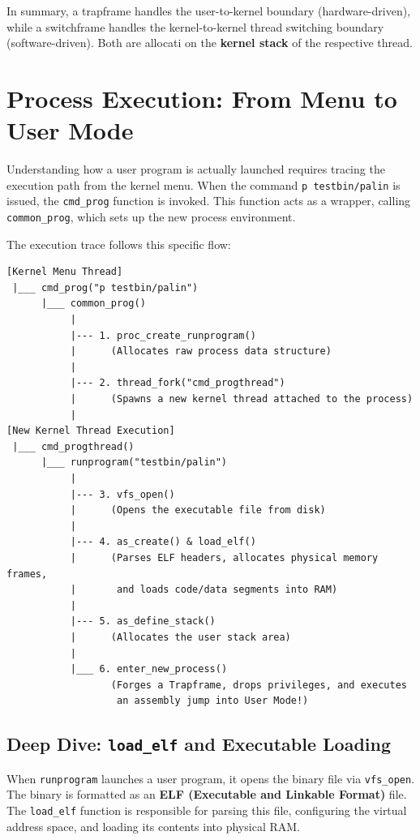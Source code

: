 In summary, a trapframe handles the user-to-kernel boundary (hardware-driven), while a switchframe handles the kernel-to-kernel thread switching boundary (software-driven). Both are allocati on the \textbf{kernel stack} of the respective thread.

\section{Process Execution: From Menu to User Mode}
Understanding how a user program is actually launched requires tracing the execution path from the kernel menu. When the command \texttt{p testbin/palin} is issued, the \texttt{cmd\_prog} function is invoked. This function acts as a wrapper, calling \texttt{common\_prog}, which sets up the new process environment.

The execution trace follows this specific flow:

\begin{verbatim}
[Kernel Menu Thread]
 |___ cmd_prog("p testbin/palin")
      |___ common_prog()
           |
           |--- 1. proc_create_runprogram()
           |      (Allocates raw process data structure)
           |
           |--- 2. thread_fork("cmd_progthread")
           |      (Spawns a new kernel thread attached to the process)
           |
[New Kernel Thread Execution]
 |___ cmd_progthread()
      |___ runprogram("testbin/palin")
           |
           |--- 3. vfs_open()
           |      (Opens the executable file from disk)
           |
           |--- 4. as_create() & load_elf()
           |      (Parses ELF headers, allocates physical memory frames,
           |       and loads code/data segments into RAM)
           |
           |--- 5. as_define_stack()
           |      (Allocates the user stack area)
           |
           |___ 6. enter_new_process()
                  (Forges a Trapframe, drops privileges, and executes 
                   an assembly jump into User Mode!)
\end{verbatim}

\subsection{Deep Dive: \texttt{load\_elf} and Executable Loading}
When \texttt{runprogram} launches a user program, it opens the binary file via \texttt{vfs\_open}. The binary is formatted as an \textbf{ELF (Executable and Linkable Format)} file. The \texttt{load\_elf} function is responsible for parsing this file, configuring the virtual address space, and loading its contents into physical RAM.

